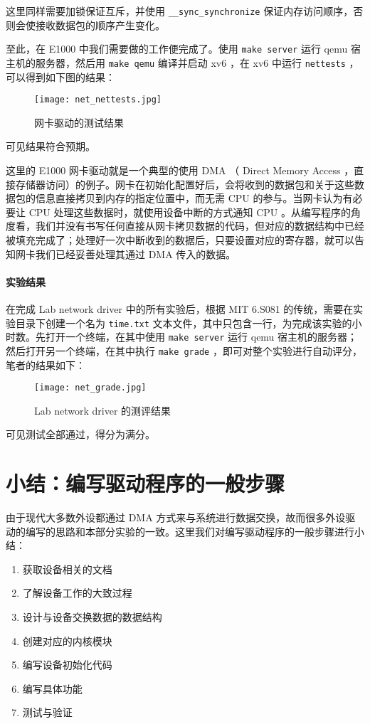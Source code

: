 这里同样需要加锁保证互斥，并使用 \lstinline{__sync_synchronize} 保证内存访问顺序，否则会使接收数据包的顺序产生变化。

至此，在 E1000 中我们需要做的工作便完成了。使用 \lstinline{make server} 运行 qemu 宿主机的服务器，然后用 \lstinline{make qemu} 编译并启动 xv6 ，在 xv6 中运行 \lstinline{nettests} ，可以得到如下图的结果：
\begin{figure}[H]
  \centering
  \texttt{[image: net\_nettests.jpg]}
  \caption{网卡驱动的测试结果}
\end{figure}

可见结果符合预期。

\begin{proposition}[关于 DMA] 
    这里的 E1000 网卡驱动就是一个典型的使用 DMA （ Direct Memory Access ，直接存储器访问）的例子。网卡在初始化配置好后，会将收到的数据包和关于这些数据包的信息直接拷贝到内存的指定位置中，而无需 CPU 的参与。当网卡认为有必要让 CPU 处理这些数据时，就使用设备中断的方式通知 CPU 。从编写程序的角度看，我们并没有书写任何直接从网卡拷贝数据的代码，但对应的数据结构中已经被填充完成了；处理好一次中断收到的数据后，只要设置对应的寄存器，就可以告知网卡我们已经妥善处理其通过 DMA 传入的数据。
\end{proposition}

\paragraph*{实验结果} 在完成 Lab network driver 中的所有实验后，根据 MIT 6.S081 的传统，需要在实验目录下创建一个名为 \lstinline{time.txt} 文本文件，其中只包含一行，为完成该实验的小时数。先打开一个终端，在其中使用 \lstinline{make server} 运行 qemu 宿主机的服务器；然后打开另一个终端，在其中执行 \lstinline{make grade} ，即可对整个实验进行自动评分，笔者的结果如下：
\begin{figure}[H]
  \centering
  \texttt{[image: net\_grade.jpg]}
  \caption{ Lab network driver 的测评结果}
\end{figure}
可见测试全部通过，得分为满分。

\section{小结：编写驱动程序的一般步骤}

由于现代大多数外设都通过 DMA 方式来与系统进行数据交换，故而很多外设驱动的编写的思路和本部分实验的一致。这里我们对编写驱动程序的一般步骤进行小结：
\begin{enumerate}
    \item 获取设备相关的文档
    \item 了解设备工作的大致过程
    \item 设计与设备交换数据的数据结构
    \item 创建对应的内核模块
    \item 编写设备初始化代码
    \item 编写具体功能
    \item 测试与验证
\end{enumerate}